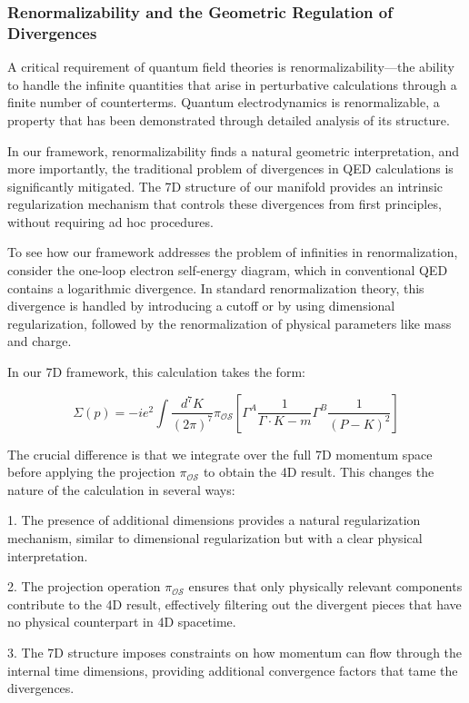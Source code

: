\documentclass{article}
\begin{document}
\subsubsection{Renormalizability and the Geometric Regulation of Divergences}

A critical requirement of quantum field theories is renormalizability—the ability to handle the infinite quantities that arise in perturbative calculations through a finite number of counterterms. Quantum electrodynamics is renormalizable, a property that has been demonstrated through detailed analysis of its structure.

In our framework, renormalizability finds a natural geometric interpretation, and more importantly, the traditional problem of divergences in QED calculations is significantly mitigated. The 7D structure of our manifold provides an intrinsic regularization mechanism that controls these divergences from first principles, without requiring ad hoc procedures.

To see how our framework addresses the problem of infinities in renormalization, consider the one-loop electron self-energy diagram, which in conventional QED contains a logarithmic divergence. In standard renormalization theory, this divergence is handled by introducing a cutoff or by using dimensional regularization, followed by the renormalization of physical parameters like mass and charge.

In our 7D framework, this calculation takes the form:

\begin{equation}
\Sigma(p) = -ie^2 \int \frac{d^7K}{(2\pi)^7} \pi_{\mathcal{OS}}\left[\Gamma^A \frac{1}{\Gamma \cdot K - m} \Gamma^B \frac{1}{(P-K)^2}\right]
\end{equation}

The crucial difference is that we integrate over the full 7D momentum space before applying the projection $\pi_{\mathcal{OS}}$ to obtain the 4D result. This changes the nature of the calculation in several ways:

1. The presence of additional dimensions provides a natural regularization mechanism, similar to dimensional regularization but with a clear physical interpretation.

2. The projection operation $\pi_{\mathcal{OS}}$ ensures that only physically relevant components contribute to the 4D result, effectively filtering out the divergent pieces that have no physical counterpart in 4D spacetime.

3. The 7D structure imposes constraints on how momentum can flow through the internal time dimensions, providing additional convergence factors that tame the divergences.
\end{document}
